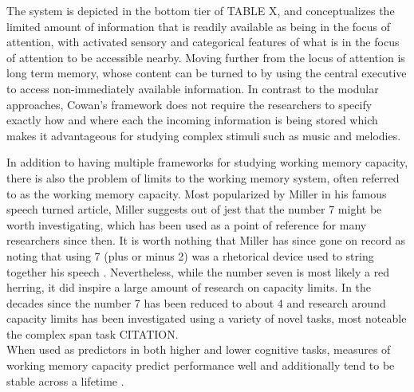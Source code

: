 \documentclass[]{book}
\begin{document}
The system is depicted in the bottom tier of TABLE X, and conceptualizes the limited amount of information that is readily available as being in the focus of attention, with activated sensory and categorical features of what is in the focus of attention to be accessible nearby.
Moving further from the locus of attention is long term memory, whose content can be turned to by using the central executive to access non-immediately available information.
In contrast to the modular approaches, Cowan's framework does not require the researchers to specify exactly how and where each the incoming information is being stored which makes it advantageous for studying complex stimuli such as music and melodies.

In addition to having multiple frameworks for studying working memory capacity, there is also the problem of limits to the working memory system, often referred to as the working memory capacity.
Most popularized by Miller in his famous \citep{millerMagicalNumberSeven1956} speech turned article, Miller suggests out of jest that the number 7 might be worth investigating, which has been used as a point of reference for many researchers since then.
It is worth nothing that Miller has since gone on record as noting that using 7 (plus or minus 2) was a rhetorical device used to string together his speech \citep{millerHistoryPsychologyAutobiography1989}.
Nevertheless, while the number seven is most likely a red herring, it did inspire a large amount of research on capacity limits.
In the decades since the number 7 has been reduced to about 4 \citep{cowanMagicalMysteryFour2010} and research around capacity limits has been investigated using a variety of novel tasks, most noteable the complex span task CITATION.\\
When used as predictors in both higher and lower cognitive tasks, measures of working memory capacity predict performance well and additionally tend to be stable across a lifetime \citep{unsworthAutomatedVersionOperation2005}.
\end{document}
